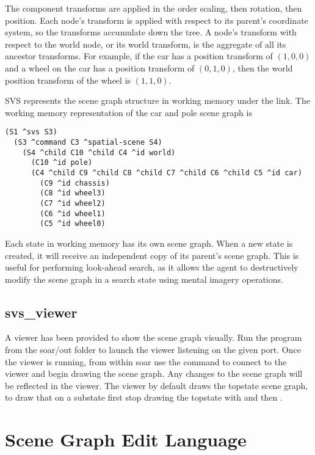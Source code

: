 The component transforms are applied in the order scaling, then rotation, then position.
Each node's transform is applied with respect to its parent's coordinate system, so the transforms accumulate down the tree.
A node's transform with respect to the world node, or its world transform, is the aggregate of all its ancestor transforms.
For example, if the car has a position transform of $(1,0,0)$ and a wheel on the car has a position transform of $(0,1,0)$, then the world position transform of the wheel is $(1,1,0)$.

SVS represents the scene graph structure in working memory under the  link.
The working memory representation of the car and pole scene graph is

\begin{verbatim}
(S1 ^svs S3)
  (S3 ^command C3 ^spatial-scene S4)
    (S4 ^child C10 ^child C4 ^id world)
      (C10 ^id pole)
      (C4 ^child C9 ^child C8 ^child C7 ^child C6 ^child C5 ^id car)
        (C9 ^id chassis)
        (C8 ^id wheel3)
        (C7 ^id wheel2)
        (C6 ^id wheel1)
        (C5 ^id wheel0)
\end{verbatim}

Each state in working memory has its own scene graph.
When a new state is created, it will receive an independent copy of its parent's scene graph.
This is useful for performing look-ahead search, as it allows the agent to destructively modify the scene graph in a search state using mental imagery operations.


\subsection{svs\_viewer}

A viewer has been provided to show the scene graph visually.
Run the program  from the soar/out folder
to launch the viewer listening on the given port. Once the viewer is running,
from within soar use the command  to connect
to the viewer and begin drawing the scene graph. Any changes to the scene graph
will be reflected in the viewer. The viewer by default draws the topstate scene graph,
to draw that on a substate first stop drawing the topstate with
 and then .

\section{Scene Graph Edit Language}

